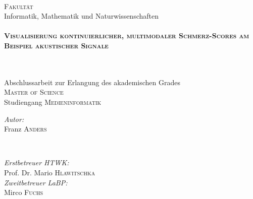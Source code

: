 \begin{titlepage}
\begin{minipage}{0.48\textwidth}
\end{minipage}\\[1cm]





\large \textsc{Fakultät} \\ Informatik, Mathematik und Naturwissenschaften\\[0.5cm] %


\HRule \\[0.4cm]
{ \huge \bfseries \textsc{Visualisierung kontinuierlicher, multimodaler Schmerz-Scores am \\[0.3cm] Beispiel akustischer Signale}}
\subtitle{Masterarbeit}\\[0.2cm] %
\HRule \\[0.5cm]
 
\large Abschlussarbeit zur Erlangung des akademischen Grades \\ 
\textsc{Master of Science}\\[2cm]

\large Studiengang \textsc{Medieninformatik}\\[3.5cm]


\begin{minipage}{0.4\textwidth}
\begin{flushleft} \large
\emph{Autor:}\\
Franz \textsc{Anders} %
\end{flushleft}
\end{minipage}
~
\begin{minipage}{0.4\textwidth}
\begin{flushright} \large
\emph{Erstbetreuer HTWK:} \\
Prof. Dr. Mario \textsc{Hlawitschka} %
\\[0.5cm]
\emph{Zweitbetreuer LaBP:} \\
Mirco \textsc{Fuchs}
\end{flushright}
\end{minipage}\\[1.5cm]


\end{titlepage}
